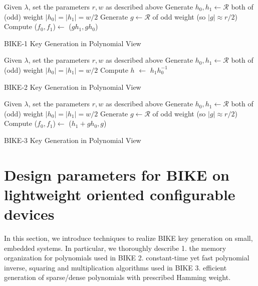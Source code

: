 \documentclass[runningheads]{llncs}
\begin{document}
\begin{algorithm}[!tbh]
 \DontPrintSemicolon %
    Given $\lambda$, set the parameters $r,w$ as described above\;
    Generate $h_0,h_1 \gets \mathcal{R}$ both of (odd) weight $|h_0|=|h_1|=w/2$\;
    Generate $g \gets \mathcal{R}$ of odd weight (so $|g|\approx r/2$)\;
    Compute ($f_0,f_1$)$\gets$ ($gh_1,gh_0$)\;
 \caption{BIKE-1 Key Generation in Polynomial View \cite{aragon2017bike}}\label{alg:bike1_keygen}
\end{algorithm}

\begin{algorithm}[!tbh]
 \DontPrintSemicolon %
    Given $\lambda$, set the parameters $r,w$ as described above\;
    Generate $h_0,h_1 \gets \mathcal{R}$ both of (odd) weight $|h_0|=|h_1|=w/2$\;
    Compute $h$ $\gets$ $h_1h_0^{-1}$\;
 \caption{BIKE-2 Key Generation in Polynomial View  \cite{aragon2017bike}}\label{alg:bike2_keygen}
\end{algorithm}

\begin{algorithm}[!tbh]
 \DontPrintSemicolon %
    Given $\lambda$, set the parameters $r,w$ as described above\;
    Generate $h_0,h_1 \gets \mathcal{R}$ both of (odd) weight $|h_0|=|h_1|=w/2$\;
    Generate $g \gets \mathcal{R}$ of odd weight (so $|g|\approx r/2$)\;
    Compute ($f_0,f_1$)$\gets$ ($h_1+gh_0,g$)\;
 \caption{BIKE-3 Key Generation in Polynomial View  \cite{aragon2017bike}}\label{alg:bike3_keygen}
\end{algorithm}

\section{Design parameters for BIKE on lightweight oriented configurable devices}
In this section, we introduce techniques to realize BIKE key generation on small, embedded systems. In particular, we thoroughly describe 1. the memory organization for polynomials used in BIKE 2. constant-time yet fast polynomial inverse, squaring and  multiplication algorithms used in BIKE 3. efficient generation of sparse/dense polynomials with prescribed Hamming weight.
\end{document}
